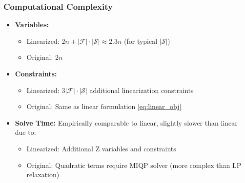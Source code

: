 \documentclass{article}
\begin{document}


\subsubsection{Computational Complexity}
\begin{itemize}
    \item \textbf{Variables:}
\begin{itemize}
    \item Linearized: $2n + |\mathcal{F}| \cdot |\mathcal{S}| \approx 2.3n$ (for typical $|\mathcal{S}|$)
    \item Original: $2n$
\end{itemize}

\item \textbf{Constraints:}
\begin{itemize}
    \item Linearized: $3|\mathcal{F}| \cdot |\mathcal{S}|$ additional linearization constraints
    \item Original: Same as linear formulation \ref{eq:linear_obj}
    
\end{itemize}


\item \textbf{Solve Time:} Empirically comparable to linear, slightly slower than linear due to:
\begin{itemize}
    \item Linearized: Additional Z variables and constraints
    \item Original: Quadratic terms require MIQP solver (more complex than LP relaxation)
\end{itemize}
\end{itemize}
\end{document}
